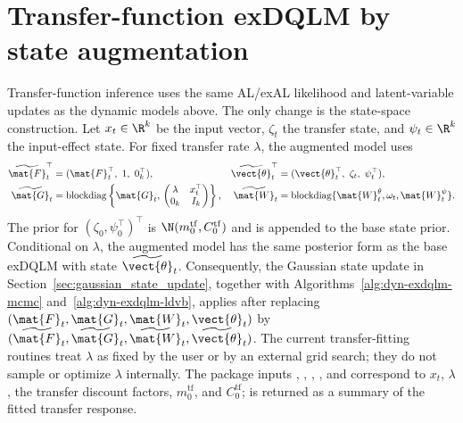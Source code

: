 \section{Transfer-function exDQLM by state augmentation}
\label{sec:transfer_function}

Transfer-function inference uses the same AL/exAL likelihood and latent-variable
updates as the dynamic models above. The only change is the state-space
construction. Let $x_t\in\R^k$ be the input vector, $\zeta_t$ the transfer
state, and $\psi_t\in\R^k$ the input-effect state. For fixed transfer rate
$\lambda$, the augmented model uses
\begin{align}
\widetilde{\mat{F}}_t^\top
&=(\mat{F}_t^\top,\ 1,\ 0_k^\top),&
\widetilde{\vect{\theta}}_t^\top
&=(\vect{\theta}_t^\top,\ \zeta_t,\ \psi_t^\top),
\label{eq:tf_aug_state}\\
\widetilde{\mat{G}}_t
&=
\operatorname{blockdiag}\left\{
\mat{G}_t,\,
\begin{pmatrix}
\lambda & x_t^\top\\
0_k & I_k
\end{pmatrix}
\right\},&
\widetilde{\mat{W}}_t
&=\operatorname{blockdiag}\{\mat{W}_t^\theta,\omega_t,\mat{W}_t^\psi\}.
\label{eq:tf_aug_mats}
\end{align}
The prior for $(\zeta_0,\psi_0^\top)^\top$ is
$\N(m_0^{\mathrm{tf}},C_0^{\mathrm{tf}})$ and is appended to the base
state prior. Conditional on $\lambda$, the augmented model has the same
posterior form as the base exDQLM with state
$\widetilde{\vect{\theta}}_t$. Consequently,
the Gaussian state update in Section~\ref{sec:gaussian_state_update}, together
with Algorithms~\ref{alg:dyn-exdqlm-mcmc} and~\ref{alg:dyn-exdqlm-ldvb},
applies after replacing
$(\mat{F}_t,\mat{G}_t,\mat{W}_t,\vect{\theta}_t)$ by
$(\widetilde{\mat{F}}_t,\widetilde{\mat{G}}_t,\widetilde{\mat{W}}_t,
\widetilde{\vect{\theta}}_t)$.
The current transfer-fitting routines treat $\lambda$ as fixed by the user or
by an external grid search; they do not sample or optimize $\lambda$
internally.
The package inputs , , , , and
 correspond to $x_t$, $\lambda$, the transfer discount factors,
$m_0^{\mathrm{tf}}$, and $C_0^{\mathrm{tf}}$;  is returned as a
summary of the fitted transfer response.

